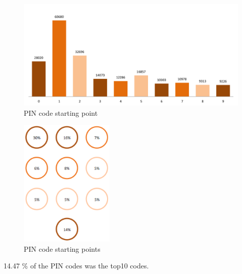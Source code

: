   \begin{figure}[H]
    \centering
    \includegraphics[width=\textwidth]{pics/analysis/pinstart.png}
    \caption{PIN code starting point}
    \label{fig:pinstart}
  \end{figure}

  \begin{figure}[H]
    \centering
    \includegraphics[width=0.40\textwidth]{pics/analysis/startpointpin.png}
    \caption{PIN code starting points}
    \label{fig:pinstart2}
  \end{figure}

  14.47 \% of the PIN codes was the top10 codes.







